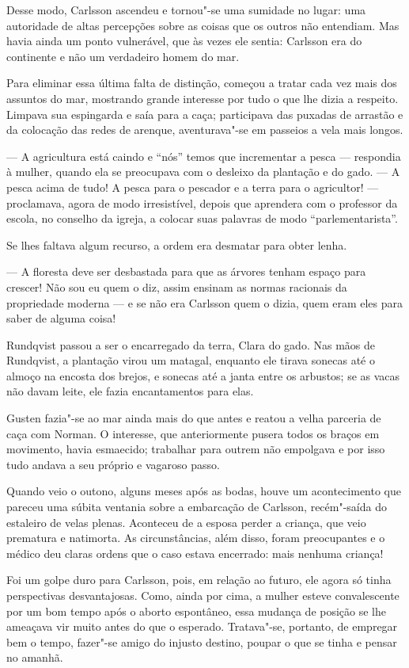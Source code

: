 Desse modo, Carlsson ascendeu e tornou"-se uma sumidade no lugar: uma
autoridade de altas percepções sobre as coisas que os outros não entendiam. Mas
havia ainda um ponto vulnerável, que às vezes ele sentia: Carlsson era do
continente e não um verdadeiro homem do mar.

Para eliminar essa última falta de distinção, começou a tratar cada vez mais
dos assuntos do mar, mostrando grande interesse por tudo o que lhe dizia a
respeito. Limpava sua espingarda e saía para a caça; participava das puxadas de
arrastão e da colocação das redes de arenque, aventurava"-se em passeios a
vela mais longos.

--- A agricultura está caindo e ``nós'' temos que incrementar a pesca --- 
respondia à mulher, quando ela se preocupava com o desleixo da 
plantação e do gado. --- A pesca acima de tudo! A pesca para o pescador e a terra
para o agricultor! --- proclamava, agora de modo irresistível, depois que
aprendera com o professor da escola, no conselho da igreja, a colocar suas
palavras de modo ``parlementarista''.

Se lhes faltava algum recurso, a ordem era desmatar para obter lenha.

--- A floresta deve ser desbastada para que as árvores tenham espaço para crescer! Não sou eu
quem o diz, assim ensinam as normas racionais da propriedade moderna --- e se não
era Carlsson quem o dizia, quem eram eles para saber de alguma coisa!

Rundqvist passou a ser o encarregado da terra, Clara do gado. Nas mãos de
Rundqvist, a plantação virou um matagal, enquanto ele tirava sonecas até o
almoço na encosta dos brejos, e sonecas até a janta entre os arbustos; se as
vacas não davam leite, ele fazia encantamentos para elas.

Gusten fazia"-se ao mar ainda mais do que antes e reatou a velha parceria de caça
com Norman. O interesse, que anteriormente pusera todos os braços em
movimento, havia esmaecido; trabalhar para outrem não empolgava e por isso tudo
andava a seu próprio e vagaroso passo. 

Quando veio o outono, alguns meses após as
bodas, houve um acontecimento que pareceu uma súbita ventania sobre a embarcação
de Carlsson, recém"-saída do estaleiro de velas plenas. Aconteceu de a esposa
perder a criança, que veio prematura e natimorta. As circunstâncias, além
disso, foram preocupantes e o médico deu claras ordens que o caso estava
encerrado: mais nenhuma criança!

Foi um golpe duro para Carlsson, pois, em relação ao futuro, ele agora só tinha
perspectivas desvantajosas. Como, ainda por cima, a mulher esteve convalescente
por um bom tempo após o aborto espontâneo, essa mudança de posição se lhe
ameaçava vir muito antes do que o esperado. Tratava"-se, portanto, de empregar bem o
tempo, fazer"-se amigo do injusto destino, poupar o que se tinha e pensar no amanhã. 

